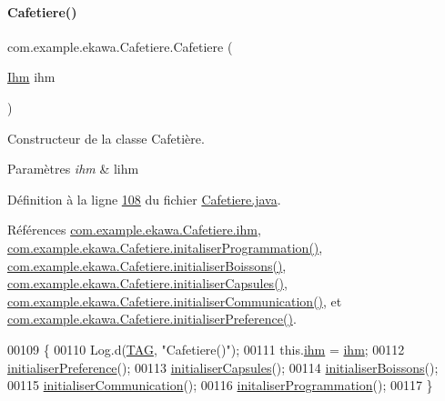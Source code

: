 \paragraph{\texorpdfstring{Cafetiere()}{Cafetiere()}}
{\footnotesize\ttfamily com.\+example.\+ekawa.\+Cafetiere.\+Cafetiere (\begin{DoxyParamCaption}\item[{\hyperlink{classcom_1_1example_1_1ekawa_1_1_ihm}{Ihm}}]{ihm }\end{DoxyParamCaption})}



Constructeur de la classe Cafetière. 


\begin{DoxyParams}{Paramètres}
{\em ihm} & l\textquotesingle{}ihm \\
\hline
\end{DoxyParams}


Définition à la ligne \hyperlink{_cafetiere_8java_source_l00108}{108} du fichier \hyperlink{_cafetiere_8java_source}{Cafetiere.\+java}.



Références \hyperlink{_cafetiere_8java_source_l00080}{com.\+example.\+ekawa.\+Cafetiere.\+ihm}, \hyperlink{_cafetiere_8java_source_l00143}{com.\+example.\+ekawa.\+Cafetiere.\+initaliser\+Programmation()}, \hyperlink{_cafetiere_8java_source_l00173}{com.\+example.\+ekawa.\+Cafetiere.\+initialiser\+Boissons()}, \hyperlink{_cafetiere_8java_source_l00162}{com.\+example.\+ekawa.\+Cafetiere.\+initialiser\+Capsules()}, \hyperlink{_cafetiere_8java_source_l00153}{com.\+example.\+ekawa.\+Cafetiere.\+initialiser\+Communication()}, et \hyperlink{_cafetiere_8java_source_l00122}{com.\+example.\+ekawa.\+Cafetiere.\+initialiser\+Preference()}.


\begin{DoxyCode}
00109     \{
00110         Log.d(\hyperlink{classcom_1_1example_1_1ekawa_1_1_cafetiere_aa0c1fd99a2508b06c462aea17034aa91}{TAG}, \textcolor{stringliteral}{"Cafetiere()"});
00111         this.\hyperlink{classcom_1_1example_1_1ekawa_1_1_cafetiere_a7db4a63088834eda5f6a3e951611bf82}{ihm} = \hyperlink{classcom_1_1example_1_1ekawa_1_1_cafetiere_a7db4a63088834eda5f6a3e951611bf82}{ihm};
00112         \hyperlink{classcom_1_1example_1_1ekawa_1_1_cafetiere_a20f3b74112d4e668a382882c4c8ccd07}{initialiserPreference}();
00113         \hyperlink{classcom_1_1example_1_1ekawa_1_1_cafetiere_a75d0df422427eed8b12e7b46a6e11a35}{initialiserCapsules}();
00114         \hyperlink{classcom_1_1example_1_1ekawa_1_1_cafetiere_ae9092a9540897e60c4cf7307073a75ab}{initialiserBoissons}();
00115         \hyperlink{classcom_1_1example_1_1ekawa_1_1_cafetiere_ad7c3e155b2ddf4dae05da8cd9c38518a}{initialiserCommunication}();
00116         \hyperlink{classcom_1_1example_1_1ekawa_1_1_cafetiere_aae065b86cdb3a8df2c904068aab7e9bf}{initaliserProgrammation}();
00117     \}
\end{DoxyCode}


